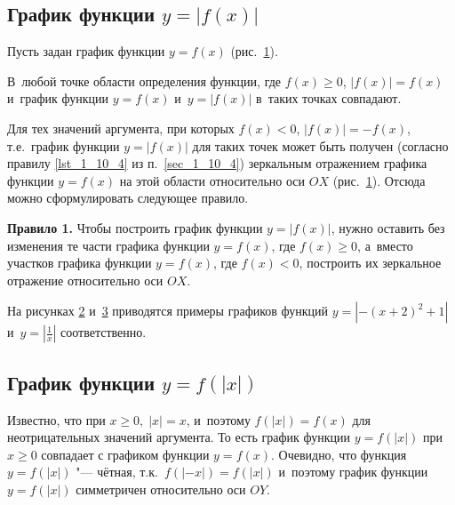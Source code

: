 \subsection{График функции $y = |f(x)|$}

Пусть задан график функции $y = f(x)$ (рис.\ \ref{fig_1_12_35}).

\begin{figure}\label{fig_1_12_35}
\end{figure}

В~любой точке области определения функции,
где $f(x) \geqslant 0$, $|f(x)| = f(x)$
и~график функции $y = f(x)$ и~$y = |f(x)|$
в~таких точках совпадают.

Для тех значений аргумента, при которых $f(x) < 0$,
$|f(x)| = -f(x)$, т.е.\ график функции $y = |f(x)|$
для таких точек может быть получен (согласно правилу \ref{lst_1_10_4}
из п.~\ref{sec_1_10_4}) зеркальным отражением графика функции $y = f(x)$
на этой области относительно оси $OX$ (рис.\ \ref{fig_1_12_35}).
Отсюда можно сформулировать следующее правило.

\textbf{Правило 1.} Чтобы построить график функции $y = |f(x)|$,
нужно оставить без изменения те части графика функции $y = f(x)$,
где $f(x) \geqslant 0$, а~вместо участков графика функции $y = f(x)$,
где $f(x) < 0$, построить их зеркальное отражение относительно оси $OX$.

\begin{figure}
\end{figure}

На рисунках \ref{fig_1_12_36} и~\ref{fig_1_12_37} приводятся примеры графиков функций
$y = |-(x + 2)^{2} + 1|$ и~$\displaystyle y = \left|\frac{1}{x}\right|$
соответственно.

\begin{figure}\label{fig_1_12_36}
\end{figure}

\begin{figure}\label{fig_1_12_37}
\end{figure}


\subsection{График функции $y = f(|x|)$}

Известно, что при $x \geqslant 0, \; |x| = x$,
и~поэтому $f(|x|) = f(x)$ для неотрицательных значений аргумента.
То есть график функции $y = f(|x|)$ при $x \geqslant 0$ совпадает с графиком
функции $y = f(x)$.
Очевидно, что функция $y = f(|x|)$ "--- чётная, т.к.\ $f(|-x|) = f(|x|)$
и~поэтому график функции $y = f(|x|)$ симметричен относительно оси $OY$.

